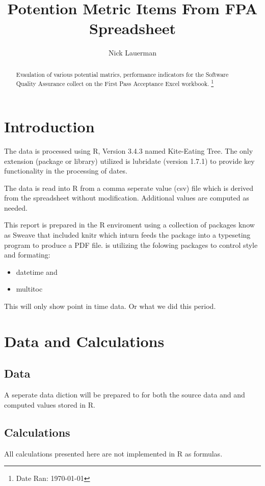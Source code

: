 \documentclass{article}
\title{Potention Metric Items From FPA Spreadsheet}
\author{Nick Lauerman}
\begin{document}

\maketitle

\begin{abstract}
Evaulation of various potential matrics, performance indicators for the Software
Quality Assurance collect on the First Pass Acceptance Excel workbook.
\footnote{Date Ran: \today \currenttime} %
\end{abstract}

\tableofcontents

\section{Introduction}
The data is processed using R, Version 3.4.3 named Kite-Eating Tree. The only
extension (package or library) utilized is lubridate (version 1.7.1) to provide
key functionality in the processing of dates.

The data is read into R from a comma seperate value (csv) file which is derived
from the spreadsheet without modification. Additional values are computed as needed.

This report is prepared in the R enviroment using a collection of packages know as
Sweave that included knitr which inturn feeds the package into \LaTeXe{} a typeseting
program to produce a PDF file. \LaTeXe{} is utilizing the folowing packages to control
style and formating:
\begin{itemize}
\item datetime and
\item multitoc
\end{itemize}

This will only show point in time data. Or what we did this period.

\section{Data and Calculations}
\subsection{Data}
A seperate data diction will be prepared to for both the source data
and and computed values stored in R.

\subsection{Calculations}
All calculations presented here are not implemented in R as formulas.
\end{document}
